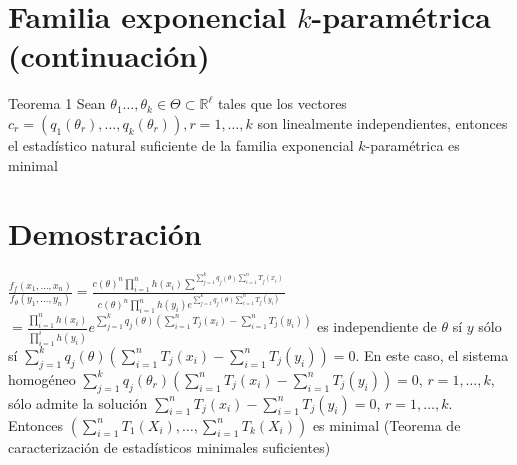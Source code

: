 \section*{Familia exponencial $k$-paramétrica (continuación)}
Teorema 1 Sean $\theta_{1} \ldots, \theta_{k} \in \Theta \subset \mathbb{R}^{\ell}$ tales que los vectores $c_{r}=\left(q_{1}\left(\theta_{r}\right), \ldots, q_{k}\left(\theta_{r}\right)\right), r=1, \ldots, k$ son linealmente independientes, entonces el estadístico natural suficiente de la familia exponencial $k$-paramétrica es minimal

\section*{Demostración}
$\frac{f_{f}\left(x_{1}, \ldots, x_{n}\right)}{f_{\theta}\left(y_{1}, \ldots, y_{n}\right)}=\frac{c(\theta)^{n} \prod_{i=1}^{n} h\left(x_{i}\right) \sum^{\sum_{j=1}^{k} q_{j}(\theta) \sum_{i=1}^{n} T_{j}\left(x_{i}\right)}}{c(\theta)^{n} \prod_{i=1}^{n} h\left(y_{i}\right) e^{\sum_{j=1}^{k} q_{j}(\theta) \sum_{i=1}^{n} T_{j}\left(y_{i}\right)}}$\\
$=\frac{\prod_{i=1}^{n} h\left(x_{i}\right)}{\prod_{i=1}^{i} h\left(y_{i}\right)} e^{\sum_{j=1}^{k} q_{j}(\theta)\left(\sum_{i=1}^{n} T_{j}\left(x_{i}\right)-\sum_{i=1}^{n} T_{j}\left(y_{i}\right)\right)}$ es independiente de $\theta$ sí $y$ sólo sí $\sum_{j=1}^{k} q_{j}(\theta)\left(\sum_{i=1}^{n} T_{j}\left(x_{i}\right)-\sum_{i=1}^{n} T_{j}\left(y_{i}\right)\right)=0$. En este caso, el sistema homogéneo $\sum_{j=1}^{k} q_{j}\left(\theta_{r}\right)\left(\sum_{i=1}^{n} T_{j}\left(x_{i}\right)-\sum_{i=1}^{n} T_{j}\left(y_{i}\right)\right)=0$, $r=1, \ldots, k$, sólo admite la solución $\sum_{i=1}^{n} T_{j}\left(x_{i}\right)-\sum_{i=1}^{n} T_{j}\left(y_{i}\right)=0$, $r=1, \ldots, k$. Entonces $\left(\sum_{i=1}^{n} T_{1}\left(X_{i}\right), \ldots, \sum_{i=1}^{n} T_{k}\left(X_{i}\right)\right)$ es minimal (Teorema de caracterización de estadísticos minimales suficientes)

